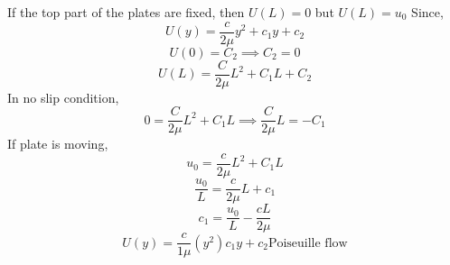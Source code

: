 \documentclass{report}
\begin{document}
\begin{enumerate}
If the top part of the plates are fixed, then $U(L) = 0$ but $U(L) = u_0$
Since,
\[
  U(y) = \frac{c}{2\mu}y^2 + c_1 y + c_2
\]
\[
  U(0) = C_2 \implies C_2 = 0
\]
\[
  U(L) = \frac{C}{2\mu}L^2 + C_1 L + C_2
\]
In no slip condition,
\[
  0 = \frac{C}{2\mu}L^2 + C_1 L \implies \frac{C}{2\mu}L = -C_1
\]
If plate is moving, 
\[
  u_0 = \frac{c}{2\mu} L^2 + C_1 L
\]
\[
  \frac{u_0}{L} = \frac{c}{2\mu}L + c_1
\]
\[
  c_1 = \frac{u_0}{L} - \frac{cL}{2\mu}
\]
\[
  U(y) = \frac{c}{1\mu}(y^2) c_1 y + c_2 \text{Poiseuille flow}
\]
\end{enumerate}
\end{document}

